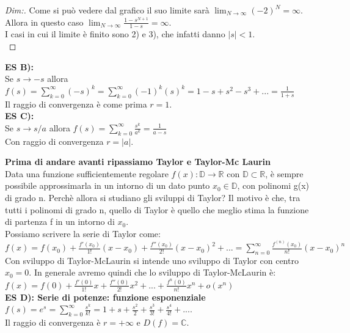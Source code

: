 \begin{proof}[Dim:]
	Come si può vedere dal grafico il suo limite sarà $ \lim_{N \to \infty} (-2)^N = \infty $.\\
	Allora in questo caso $ \lim_{N \to \infty} \frac{ 1-s^{N+1} }{ 1-s } = \infty $.\\
	
	I casi in cui il limite è finito sono 2) e 3), che infatti danno $ |s| < 1$.\\
	
\end{proof}

\textbf{ES B):}\\
Se $ s \longrightarrow -s$ allora $ f(s) = \sum_{k=0}^\infty (-s)^{k} = \sum_{k=0}^\infty (-1)^{k} (s)^k = 1 -s + s^2 - s^3 +...= \frac{1}{1+s}$\\
Il raggio di convergenza è come prima $r=1$.\\

\textbf{ES C):}\\
Se $ s \longrightarrow s/a$ allora $ f(s) = \sum_{k=0}^\infty \frac{s^k}{a^k} = \frac{1}{a-s}$\\
Con raggio di convergenza $ r = |a|$.

\textbf{Prima di andare avanti ripassiamo Taylor e Taylor-Mc Laurin}\\
Data una funzione sufficientemente regolare $ f(x):\mathbb{D} \longrightarrow \mathbb{R} $ con $ \mathbb{D} \subset \mathbb{R} $, è sempre possibile approssimarla in un intorno di un dato punto $ x_0 \in \mathbb{D} $, con polinomi g(x) di grado n. Perchè allora si studiano gli sviluppi di Taylor? Il motivo è che, tra tutti i polinomi di grado n, quello di Taylor è quello che meglio stima la funzione di partenza f in un intorno di $ x_0 $.\\
Possiamo scrivere la serie di Taylor come:\\
 $ f(x) = f(x_0) + \frac{ f'(x_0)}{1!} (x-x_0) + \frac{ f''(x_0)}{2!} (x-x_0)^2 +... = \sum_{n=0}^\infty \frac{ f^{(n)}(x_0) }{n!} (x-x_0)^n$\\
Con sviluppo di Taylor-McLaurin si intende uno sviluppo di Taylor con centro $x_0=0$.
In generale avremo quindi che lo sviluppo di Taylor-McLaurin è:\\
$ f(x) = f(0) + \frac{ f'(0)}{1!} x + \frac{ f''(0)}{2!} x^2+... + \frac{ f^{n}(0)}{n!} x^n+ o(x^n)$ \\

\textbf{ES D): Serie di potenze: funzione esponenziale}\\
$ f(s) = e^{s} = \sum_{k=0}^\infty \frac{s^{k}}{k!} = 1 +s + \frac{s^2}{2} + \frac{s^3}{3!} + \frac{s^4}{4!}+... $.\\
Il raggio di convergenza è $ r = +\infty$ e $ D(f)= \mathbb{C}$.\\

